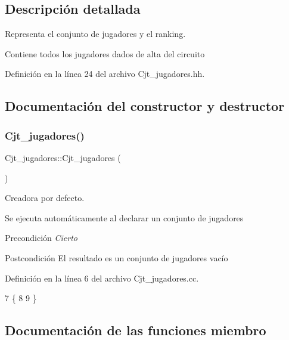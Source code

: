 \subsection{Descripción detallada}
Representa el conjunto de jugadores y el ranking. 

Contiene todos los jugadores dados de alta del circuito 

Definición en la línea 24 del archivo Cjt\+\_\+jugadores.\+hh.



\subsection{Documentación del constructor y destructor}
\mbox{\label{class_cjt__jugadores_af40661f610000ab6febf3ea0de7a451b}} 
\subsubsection{\texorpdfstring{Cjt\+\_\+jugadores()}{Cjt\_jugadores()}}
{\footnotesize\ttfamily Cjt\+\_\+jugadores\+::\+Cjt\+\_\+jugadores (\begin{DoxyParamCaption}{ }\end{DoxyParamCaption})}



Creadora por defecto. 

Se ejecuta automáticamente al declarar un conjunto de jugadores \begin{DoxyPrecond}{Precondición}
{\itshape Cierto} 
\end{DoxyPrecond}
\begin{DoxyPostcond}{Postcondición}
El resultado es un conjunto de jugadores vacío 
\end{DoxyPostcond}


Definición en la línea 6 del archivo Cjt\+\_\+jugadores.\+cc.


\begin{DoxyCode}
7 \{
8 
9 \}
\end{DoxyCode}


\subsection{Documentación de las funciones miembro}
\mbox{\label{class_cjt__jugadores_a9aff76f40c40d4856649fa97330fd0d0}} 
